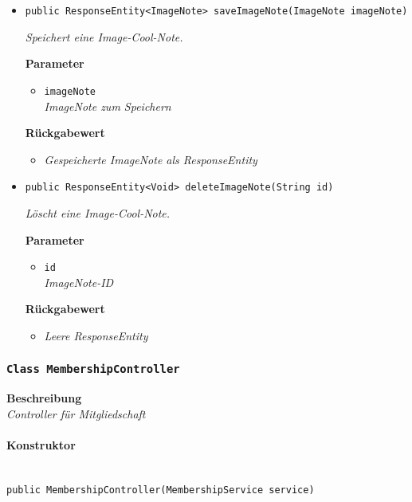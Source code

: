 \begin{itemize}
     \item{\texttt{public ResponseEntity<ImageNote> saveImageNote(ImageNote imageNote)}}
     	
     	\textit{Speichert eine Image-Cool-Note.}
     	
     	\textbf{Parameter}
     	\begin{itemize}
     		\item\texttt{imageNote}\\
     		\textit{ImageNote zum Speichern}  
     	\end{itemize}
     	
     	\textbf{Rückgabewert}
     	\begin{itemize}
     		\item\textit{Gespeicherte ImageNote als ResponseEntity} 
     	\end{itemize}
     
     \item{\texttt{public ResponseEntity<Void> deleteImageNote(String id)}}
     	
     	\textit{Löscht eine Image-Cool-Note.}
     	
     	\textbf{Parameter}
     	\begin{itemize}
     		\item\texttt{id}\\
     		\textit{ImageNote-ID}  
     	\end{itemize}
     	
     	\textbf{Rückgabewert}
     	\begin{itemize}
     		\item\textit{Leere ResponseEntity} 
     	\end{itemize}
     \end{itemize}
 
     \subsubsection{\texttt{Class MembershipController}}
     \textbf{Beschreibung} \\
     \textit{Controller für Mitgliedschaft}
     \paragraph*{Konstruktor}\mbox{} \\
     \texttt{public MembershipController(MembershipService service)}
